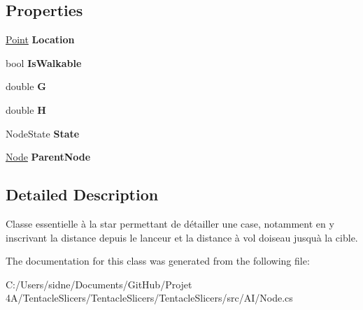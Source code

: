\subsection*{Properties}
\begin{DoxyCompactItemize}
\item 
\mbox{\label{class_tentacle_slicers_1_1_a_i_1_1_node_a673298dc63d424b8a0c6e8392a14c74f}} 
\hyperlink{class_tentacle_slicers_1_1general_1_1_point}{Point} {\bfseries Location}
\item 
\mbox{\label{class_tentacle_slicers_1_1_a_i_1_1_node_a6297548559e92b6d74d22283efd5161f}} 
bool {\bfseries Is\+Walkable}
\item 
\mbox{\label{class_tentacle_slicers_1_1_a_i_1_1_node_a60a7feafa47b43216cbc5b87527dfe4e}} 
double {\bfseries G}
\item 
\mbox{\label{class_tentacle_slicers_1_1_a_i_1_1_node_acbf27c80cf169521082c464b19b9d33f}} 
double {\bfseries H}
\item 
\mbox{\label{class_tentacle_slicers_1_1_a_i_1_1_node_ab5dc2b28ee17e1e96fdf4cdeb408f609}} 
Node\+State {\bfseries State}
\item 
\mbox{\label{class_tentacle_slicers_1_1_a_i_1_1_node_af942d951ae73a52be52f24307c967991}} 
\hyperlink{class_tentacle_slicers_1_1_a_i_1_1_node}{Node} {\bfseries Parent\+Node}
\end{DoxyCompactItemize}


\subsection{Detailed Description}
Classe essentielle à l\textquotesingle{}a star permettant de détailler une case, notamment en y inscrivant la distance depuis le lanceur et la distance à vol d\textquotesingle{}oiseau jusqu\textquotesingle{}à la cible. 



The documentation for this class was generated from the following file\+:\begin{DoxyCompactItemize}
\item 
C\+:/\+Users/sidne/\+Documents/\+Git\+Hub/\+Projet 4\+A/\+Tentacle\+Slicers/\+Tentacle\+Slicers/\+Tentacle\+Slicers/src/\+A\+I/Node.\+cs\end{DoxyCompactItemize}
